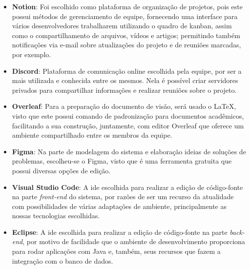 \begin{itemize}
\item \textbf{Notion}: Foi escolhido como plataforma de organização de projetos, pois este possui métodos de gerenciamento de equipe, fornecendo uma interface para vários desenvolvedores trabalharem utilizando o quadro de kanban, assim como o compartilhamento de arquivos, vídeos e artigos; permitindo também notificações via e-mail sobre atualizações do projeto e de reuniões marcadas, por exemplo. 
    
\item \textbf{Discord}: Plataforma de comunicação online escolhida pela equipe, por ser a mais utilizada e conhecida entre os mesmos. Nela é possível criar servidores privados para compartilhar informações e realizar reuniões sobre o projeto.
    
\item \textbf{Overleaf}: Para a preparação do documento de visão, será usado o \LaTeX, visto que este possui comando de padronização para documentos acadêmicos, facilitando a sua construção, juntamente, com editor Overleaf que oferece um ambiente compartilhado entre os membros da equipe. 
    
\item \textbf{Figma}: Na parte de modelagem do sistema e elaboração ideias de soluções de problemas, escolheu-se o Figma, visto que é uma ferramenta gratuita que possui diversas opções de edição.
    
\item \textbf{Visual Studio Code}: A \acs{ide} escolhida para realizar a edição de código-fonte na parte \textsl{\gls{front-end}} do sistema, por razões de ser um recurso da atualidade com possibilidades de várias adaptações de ambiente, principalmente as nossas tecnologias escolhidas.

\item \textbf{Eclipse}: A \acs{ide} escolhida para realizar a edição de código-fonte na parte \textsl{\gls{back-end}}, por motivo de facilidade que o ambiente de desenvolvimento proporciona para rodar aplicações com Java e, também, seus recursos que fazem a integração com o banco de dados.
\end{itemize}


